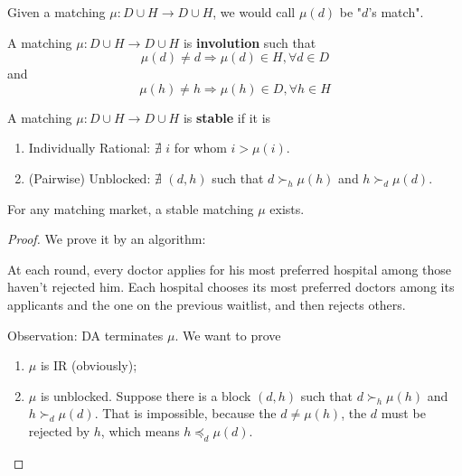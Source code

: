 \documentclass[11pt]{elegantbook}
\begin{document}
\begin{note}
    Given a matching $\mu: D\cup H \rightarrow D\cup H$, we would call $\mu(d)$ be "$d$'s match".
\end{note}

\begin{definition}[Involution]
    \normalfont
    A matching $\mu: D\cup H \rightarrow D\cup H$ is \textbf{involution} such that $$\mu (d)\neq d \Rightarrow \mu(d)\in H, \forall d\in D$$ and $$\mu (h)\neq h \Rightarrow \mu(h)\in D, \forall h\in H$$
\end{definition}

\begin{definition}[Stable]
    \normalfont
    A matching $\mu: D\cup H \rightarrow D\cup H$ is \textbf{stable} if it is
    \begin{enumerate}[$\circ$]
        \item Individually Rational: $\nexists$ $i$ for whom $i>\mu(i)$.
        \item (Pairwise) Unblocked: $\nexists$ $(d,h)$ such that $d\succ_h \mu(h)$ and $h\succ_d \mu(d)$.
    \end{enumerate}
\end{definition}

\begin{theorem}
    For any matching market, a stable matching $\mu$ exists.
\end{theorem}
\begin{proof}
    We prove it by an algorithm:
    \begin{definition}
        \normalfont
        At each round, every doctor applies for his most preferred hospital among those haven't rejected him. Each hospital chooses its most preferred doctors among its applicants and the one on the previous waitlist, and then rejects others.
    \end{definition}
    Observation: DA terminates $\mu$. We want to prove
    \begin{enumerate}
        \item $\mu$ is IR (obviously);
        \item $\mu$ is unblocked.
        \subitem Suppose there is a block $(d,h)$ such that $d\succ_h \mu(h)$ and $h\succ_d \mu(d)$. That is impossible, because the $d\neq \mu(h)$, the $d$ must be rejected by $h$, which means $h\preceq_d \mu(d)$.
    \end{enumerate}
\end{proof}
\end{document}
